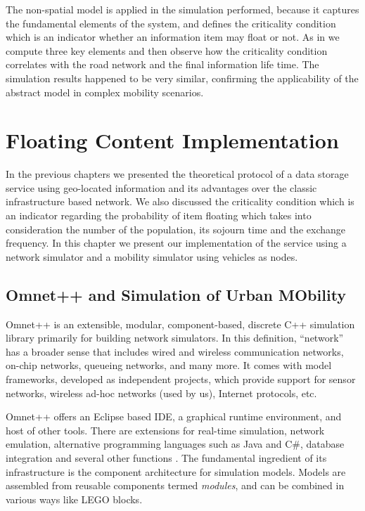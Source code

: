 The non-spatial model is applied in the simulation performed, because it
captures the fundamental elements of the system, and defines the criticality
condition which is an indicator whether an information item may float or not. As
in \cite{percomfloatingcontent} we compute three key elements and then observe
how the criticality condition correlates with the road network and the final
information life time. The simulation results happened to be very similar,
confirming the applicability of the abstract model in complex mobility
scenarios.





\chapter{Floating Content Implementation} \label{chap3}

In the previous chapters we presented the theoretical protocol of a data storage
service using geo-located information and its advantages over the classic
infrastructure based network. We also discussed the criticality condition which
is an indicator regarding the probability of item floating which takes into
consideration the number of the population, its sojourn time and the exchange
frequency. In this chapter we present our implementation of the service using a
network simulator and a mobility simulator using vehicles as nodes.

\section{Omnet++ and Simulation of Urban MObility}

Omnet++ is an extensible, modular, component-based, discrete C++ simulation
library primarily for building network simulators. In this definition, ``network''
has a broader sense that includes wired and wireless communication networks,
on-chip networks, queueing networks, and many more. It comes with model
frameworks, developed as independent projects, which provide support for sensor
networks, wireless ad-hoc networks (used by us), Internet protocols, etc.

Omnet++ offers an Eclipse based IDE, a graphical runtime environment, and host
of other tools. There are extensions for real-time simulation, network
emulation, alternative programming languages such as Java and C\#, database
integration and several other functions \cite{omnetpp}. The fundamental
ingredient of its infrastructure is the component architecture for simulation
models. Models are assembled from reusable components termed {\it modules}, and
can be combined in various ways like LEGO blocks.

